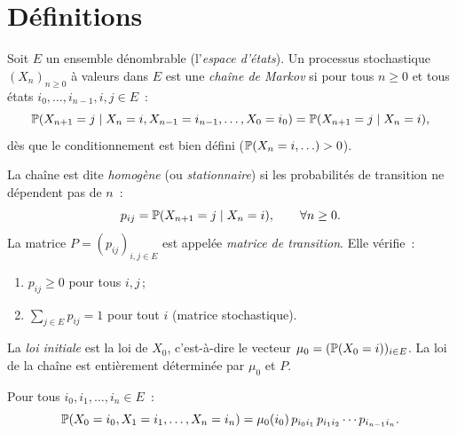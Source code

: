 \section{D\'efinitions}

\begin{definition}
\label{def:chaine_markov}
Soit $E$ un ensemble d\'enombrable (l'\emph{espace d'\'etats}). Un processus
stochastique $(X_n)_{n \geq 0}$ \`a valeurs dans $E$ est une \emph{cha\^ine de Markov}
si pour tous $n \geq 0$ et tous \'etats $i_0, \ldots, i_{n-1}, i, j \in E$~:
\[
    \mathbb{P}(X_{n+1} = j \mid X_n = i, X_{n-1} = i_{n-1}, \ldots, X_0 = i_0)
    = \mathbb{P}(X_{n+1} = j \mid X_n = i),
\]
d\`es que le conditionnement est bien d\'efini ($\mathbb{P}(X_n = i, \ldots) > 0$).
\end{definition}

\begin{definition}
\label{def:matrice_transition}
La cha\^ine est dite \emph{homog\`ene} (ou \emph{stationnaire}) si les probabilit\'es
de transition ne d\'ependent pas de $n$~:
\[
    p_{ij} = \mathbb{P}(X_{n+1} = j \mid X_n = i), \qquad \forall n \geq 0.
\]
La matrice $P = (p_{ij})_{i,j \in E}$ est appel\'ee \emph{matrice de transition}.
Elle v\'erifie~:
\begin{enumerate}
    \item[(i)] $p_{ij} \geq 0$ pour tous $i, j$\,;
    \item[(ii)] $\sum_{j \in E} p_{ij} = 1$ pour tout $i$ \quad (matrice stochastique).
\end{enumerate}
\end{definition}

\begin{definition}
La \emph{loi initiale} est la loi de $X_0$, c'est-\`a-dire le vecteur
$\mu_0 = (\mathbb{P}(X_0 = i))_{i \in E}$.
La loi de la cha\^ine est enti\`erement d\'etermin\'ee par $\mu_0$ et $P$.
\end{definition}

\begin{proposition}
Pour tous $i_0, i_1, \ldots, i_n \in E$~:
\[
    \mathbb{P}(X_0 = i_0, X_1 = i_1, \ldots, X_n = i_n)
    = \mu_0(i_0)\, p_{i_0 i_1}\, p_{i_1 i_2} \cdots p_{i_{n-1} i_n}.
\]
\end{proposition}

